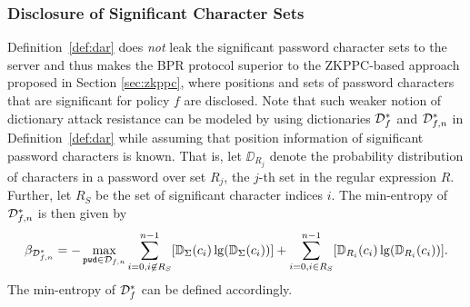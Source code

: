 
\subsubsection{Disclosure of Significant Character Sets} %
Definition~\ref{def:dar} does \emph{not} leak the significant password character sets to the server and thus makes the \ac{BPR} protocol superior to the \ac{ZKPPC}-based approach proposed in Section \ref{sec:zkppc}, where positions and sets of password characters that are significant for policy $f$ are disclosed. 
Note that such weaker notion of dictionary attack resistance can be modeled by using dictionaries $\mathcal{D}_{f}^\ast$ and $\mathcal{D}_{f,n}^\ast$ in Definition~\ref{def:dar} while assuming that position information of significant password characters is known. 
That is,
let $\DD_{R_j}$ denote the probability distribution of characters in a password \pwd over set $R_j$, the $j$-th set in the regular expression $R$.
Further, let $R_S$ be the set of significant character indices $i$.
The min-entropy of $\mathcal{D}_{f,n}^\ast$ is then given by
\[\beta_{\mathcal{D}^\ast_{f,n}} = -\max_{\mathtt{pwd}\in \mathcal{D}_{f,n}} \sum_{i=0, i\not\in R_S}^{n-1} [\mathbb{D}_\Sigma(c_i)\lg(\mathbb{D}_\Sigma(c_i))] + \sum_{i=0, i\in R_S}^{n-1} [\mathbb{D}_{R_i}(c_i)\lg(\mathbb{D}_{R_i}(c_i))].\]
The min-entropy of $\mathcal{D}_{f}^\ast$ can be defined accordingly.

